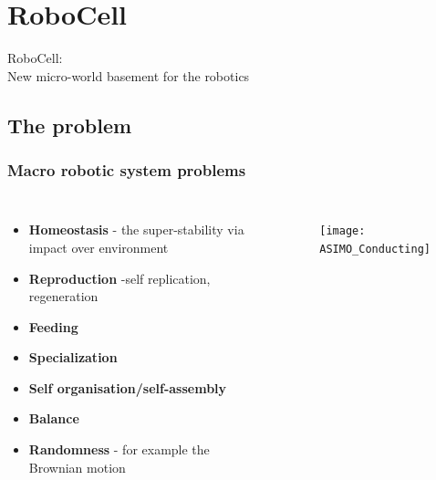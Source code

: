 \documentclass[12pt, aspectratio=169]{beamer}
\begin{document}
\section{RoboCell}
\begin{frame}
  RoboCell:\\
  New micro-world basement for the robotics
\end{frame}

\subsection{The problem} %
\begin{frame}
\frametitle{Macro robotic system problems}
\begin{columns}[c] %

\begin{itemize}
\item \textbf{Homeostasis} - the super-stability via impact over environment 
\item \textbf{Reproduction} -self replication, regeneration
\item \textbf{Feeding}
\item \textbf{Specialization}
\item \textbf{Self organisation/self-assembly}
\item \textbf{Balance}
\item \textbf{Randomness} - for example the Brownian motion
\end{itemize}

\begin{figure}
\texttt{[image: ASIMO\_Conducting]}
\end{figure}
\end{columns}
\end{frame}
\end{document}

